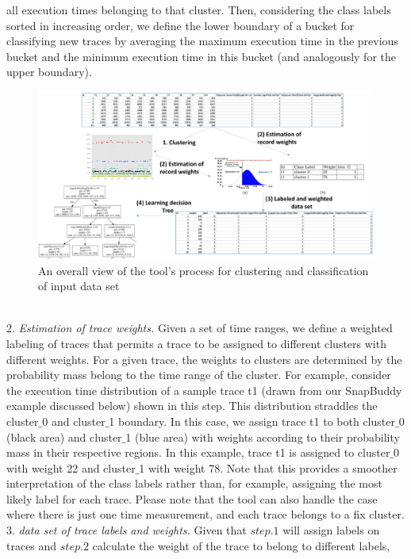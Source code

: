 \documentclass{article}
\begin{document}
all execution times belonging to that cluster. Then, considering the
class labels sorted in increasing order, we define the lower boundary
of a bucket for classifying new traces by averaging the maximum
execution time in the previous bucket and the minimum execution time
in this bucket (and analogously for the upper boundary). 
\begin{figure}[t]
    \centering
    \includegraphics[width=1\textwidth]{Methodology}
    \caption{An overall view of the tool's process for clustering and classification of input data set}
    \label{Methodology}
\end{figure}
\\2. \smallskip\textit{Estimation of trace weights.}
Given a set of time ranges, we define a weighted labeling of traces
that permits a trace to be assigned to different clusters with different weights.
For a given trace, the weights to clusters are determined by the
probability mass belong to the time range of the cluster.  For
example, consider the execution time distribution of a sample trace t1
(drawn from our SnapBuddy example discussed below) shown in
this step. This distribution straddles the
cluster$\_$0 and cluster$\_$1 boundary.  In this case, we assign trace
t1 to both cluster$\_$0 (black area) and cluster$\_$1 (blue area) with
weights according to their probability mass in their respective
regions. In this example, trace t1 is assigned
to cluster$\_$0 with weight 22 and cluster$\_$1 with weight 78. Note
that this provides a smoother interpretation of the class labels
rather than, for example, assigning the most likely label for each
trace. Please note that the tool can also handle the case where
there is just one time measurement, and each trace belongs to a
fix cluster. \\
3. \smallskip\textit{data set of trace labels and weights.}
Given that $step.1$ will assign labels on traces and $step.2$
calculate the weight of the trace to belong to different labels,
\end{document}
